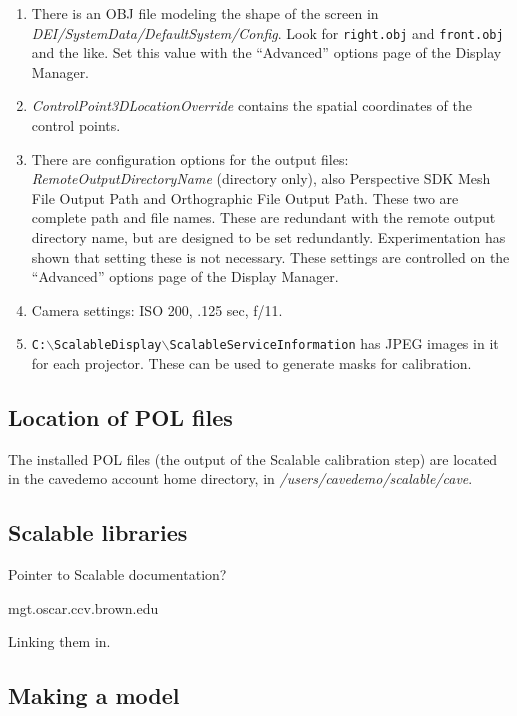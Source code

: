 \documentclass[11pt]{article}
\newcommand{\cmd}[1]{\texttt{#1}\xspace}
\newcommand{\dir}[1]{\textit{#1}\xspace}
\newcommand{\menu}[1]{``#1''\xspace}
\newcommand{\file}[1]{\texttt{#1}\xspace}
\newcommand{\bs}{$\backslash$}
\begin{document}
\begin{enumerate}
\item There is an OBJ file modeling the shape of the screen in
  \dir{DEI/SystemData/DefaultSystem/Config}.  Look for \cmd{right.obj}
  and \cmd{front.obj} and the like.  Set this value with the
  \menu{Advanced} options page of the Display Manager.

\item \dir{ControlPoint3DLocationOverride} contains the spatial coordinates
  of the control points.

\item There are configuration options for the output files:
  \dir{RemoteOutputDirectoryName} (directory only), also Perspective
  SDK Mesh File Output Path and Orthographic File Output Path.  These two are
  complete path and file names.  These are redundant with the remote
  output directory name, but are designed to be set redundantly.
  Experimentation has shown that setting these is not necessary.
  These settings are controlled on the
``Advanced'' options page of the Display Manager.

\item Camera settings: ISO 200, .125 sec, f/11.

\item \file{C:\bs ScalableDisplay\bs ScalableServiceInformation} has
  JPEG images in it for each projector.  These can be used to generate
  masks for calibration.

\end{enumerate}


\subsection{Location of POL files}
\label{pol-location}

The installed POL files (the output of the Scalable calibration step)
are located in the cavedemo account home directory, in
\dir{/users/cavedemo/scalable/cave}.


\subsection{Scalable libraries}

Pointer to Scalable documentation?

mgt.oscar.ccv.brown.edu

Linking them in.


\subsection{Making a model}
\end{document}
